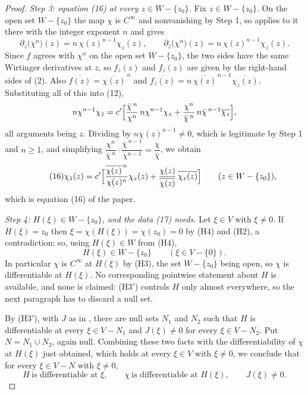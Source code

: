 \begin{proof}
\emph{Step 3: equation (16) at every $z\in W-\{z_0\}$.}  Fix $z\in W-\{z_0\}$.  On
the open set $W-\{z_0\}$ the map $\chi$ is $C^\infty$ and nonvanishing by Step 1,
so  applies to it there with the integer exponent
$n$ and gives
\begin{equation}\tag{2}
  \partial_z\bigl(\chi^{n}\bigr)(z)=n\,\chi(z)^{n-1}\chi_z(z),\qquad
  \partial_{\bar z}\bigl(\chi^{n}\bigr)(z)=n\,\chi(z)^{n-1}\chi_{\bar z}(z).
\end{equation}
Since $f$ agrees with $\chi^{n}$ on the open set $W-\{z_0\}$, the two sides have
the same Wirtinger derivatives at $z$, so $f_z(z)$ and $f_{\bar z}(z)$ are
given by the right-hand sides of (2).  Also
$\overline{f(z)}=\overline{\chi(z)}^{\,n}$ and
$\overline{f_z(z)}=n\,\overline{\chi(z)}^{\,n-1}\overline{\chi_z(z)}$.
Substituting all of this into (12),
\[
  n\chi^{n-1}\chi_{\bar z}
  =c'\Bigl[\frac{\bar\chi^{\,n}}{\chi^{n}}\,n\chi^{n-1}\chi_z
    +\frac{\chi^{n}}{\bar\chi^{\,n}}\,n\bar\chi^{\,n-1}\overline{\chi_z}\Bigr],
\]
all arguments being $z$.  Dividing by $n\chi(z)^{n-1}\neq0$, which is legitimate
by Step 1 and $n\ge1$, and simplifying
$\dfrac{\chi^{n}}{\bar\chi^{\,n}}\cdot\dfrac{\bar\chi^{\,n-1}}{\chi^{n-1}}
=\dfrac{\chi}{\bar\chi}$, we obtain
\begin{equation}\tag{16}
  \chi_{\bar z}(z)=c'\Bigl[\frac{\overline{\chi(z)}^{\,n}}{\chi(z)^{n}}\chi_z(z)
    +\frac{\chi(z)}{\overline{\chi(z)}}\,\overline{\chi_z(z)}\Bigr]
  \qquad(z\in W-\{z_0\}),
\end{equation}
which is equation (16) of the paper.

\emph{Step 4: $H(\xi)\in W-\{z_0\}$, and the data (17) needs.}  Let $\xi\in V$
with $\xi\neq0$.  If $H(\xi)=z_0$ then $\xi=\chi(H(\xi))=\chi(z_0)=0$ by (H4)
and (H2), a contradiction; so, using $H(\xi)\in W$ from (H4),
\begin{equation}\tag{3}
  H(\xi)\in W-\{z_0\}\qquad(\xi\in V-\{0\}).
\end{equation}
In particular $\chi$ is $C^\infty$ at $H(\xi)$ by (H3), the set $W-\{z_0\}$
being open, so $\chi$ is differentiable at $H(\xi)$.  No corresponding
pointwise statement about $H$ is available, and none is claimed: (H3$'$)
controls $H$ only almost everywhere, so the next paragraph has to discard a
null set.

By (H3$'$), with $J$ as in , there are null sets $N_1$ and $N_2$
such that $H$ is differentiable at every $\xi\in V-N_1$ and $J(\xi)\neq0$ for
every $\xi\in V-N_2$.  Put $N=N_1\cup N_2$, again null.  Combining these two
facts with the differentiability of $\chi$ at $H(\xi)$ just obtained, which
holds at every $\xi\in V$ with $\xi\neq0$, we conclude that for every
$\xi\in V-N$ with $\xi\neq0$,
\begin{equation}\tag{4}
  H\ \text{is differentiable at }\xi,\qquad
  \chi\ \text{is differentiable at }H(\xi),\qquad
  J(\xi)\neq0 .
\end{equation}


\end{proof}
